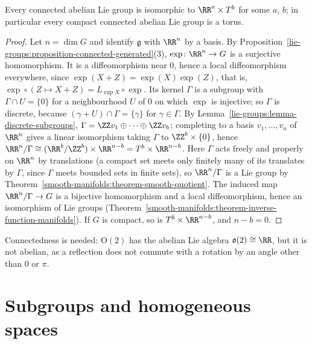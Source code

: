 \begin{theorem}\label{lie-groups:theorem-abelian}
Every connected abelian Lie group is isomorphic to $\RR^a \times T^b$ for some $a$, $b$; in particular every compact connected abelian Lie group is a torus.
\end{theorem}

\begin{proof}
Let $n = \dim G$ and identify $\mathfrak{g}$ with $\RR^n$ by a basis. By Proposition~\ref{lie-groups:proposition-connected-generated}(3),
$\exp \colon \RR^n \to G$ is a surjective homomorphism. It is a diffeomorphism near $0$, hence a local diffeomorphism everywhere, since
$\exp(X + Z) = \exp(X)\exp(Z)$, that is, $\exp \circ (Z \mapsto X + Z) = L_{\exp X} \circ \exp$. Its kernel $\Gamma$ is a subgroup with $\Gamma \cap U = \{0\}$
for a neighbourhood $U$ of $0$ on which $\exp$ is injective; so $\Gamma$ is discrete, because $(\gamma + U) \cap \Gamma = \{\gamma\}$ for $\gamma \in \Gamma$. By
Lemma~\ref{lie-groups:lemma-discrete-subgroups}, $\Gamma = \ZZ v_1 \oplus \cdots \oplus \ZZ v_b$; completing to a basis $v_1, \ldots, v_n$ of $\RR^n$ gives a
linear isomorphism taking $\Gamma$ to $\ZZ^b \times \{0\}$, hence $\RR^n/\Gamma \cong (\RR^b/\ZZ^b) \times \RR^{n-b} = T^b \times \RR^{n-b}$. Here $\Gamma$ acts
freely and properly on $\RR^n$ by translations (a compact set meets only finitely many of its translates by $\Gamma$, since $\Gamma$ meets bounded sets in finite
sets), so $\RR^n/\Gamma$ is a Lie group by Theorem~\ref{smooth-manifolds:theorem-smooth-quotient}. The induced map $\RR^n/\Gamma \to G$ is a bijective
homomorphism and a local diffeomorphism, hence an isomorphism of Lie groups (Theorem~\ref{smooth-manifolds:theorem-inverse-function-manifolds}). If $G$ is
compact, so is $T^b \times \RR^{n-b}$, and $n - b = 0$.
\end{proof}

\begin{counterexample}\label{lie-groups:counterexample-abelian-algebra}
Connectedness is needed: $\mathrm{O}(2)$ has the abelian Lie algebra $\mathfrak{o}(2) \cong \RR$, but it is not abelian, as a reflection does not commute with a rotation by an angle other than $0$ or $\pi$.
\end{counterexample}

\section{Subgroups and homogeneous spaces}\label{lie-groups:section-homogeneous}

